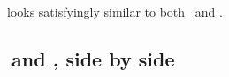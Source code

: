 \documentclass[article,screen,12pt, nonacm]{acmart}
\begin{document}
    \VMinus\ looks satisfyingly similar to both \PPlus\ and \VC. 

    \subsection{\VMinus\ and \PPlus, side by side}





\end{document}
